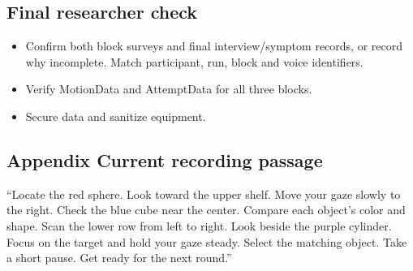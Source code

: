 \subsection{Final researcher check}\label{final-researcher-check}

\begin{itemize}
\item
  Confirm both block surveys and final interview/symptom records, or
  record why incomplete. Match participant, run, block and voice
  identifiers.
\item
  Verify MotionData and AttemptData for all three blocks.
\item
  Secure data and sanitize equipment.
\end{itemize}

\subsection{Appendix Current recording
passage}\label{appendix-current-recording-passage}

``Locate the red sphere. Look toward the upper shelf. Move your gaze
slowly to the right. Check the blue cube near the center. Compare each
object's color and shape. Scan the lower row from left to right. Look
beside the purple cylinder. Focus on the target and hold your gaze
steady. Select the matching object. Take a short pause. Get ready for
the next round.''
